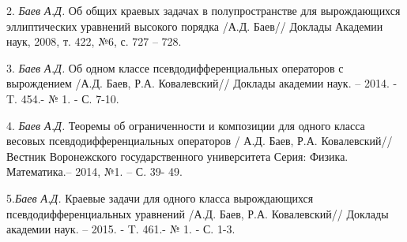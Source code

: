 2. {\it Баев А.Д.} Об общих краевых задачах в полупространстве для вырождающихся
эллиптических уравнений высокого порядка /А.Д. Баев// Доклады Академии наук,
2008, т. 422, №6, с. 727 -- 728.

3. {\it Баев А.Д.} Об одном классе псевдодифференциальных операторов с вырождением
/А.Д. Баев, Р.А. Ковалевский// Доклады академии наук. -- 2014. - T. 454.- №
1. - С. 7-10.

4. {\it Баев А.Д.} Теоремы об ограниченности и композиции для одного класса весовых
псевдодифференциальных операторов / А.Д. Баев, Р.А. Ковалевский// Вестник
Воронежского государственного университета Серия: Физика. Математика.--
2014, №1. -- С. 39- 49.

5.{\it Баев А.Д.} Краевые задачи для одного класса вырождающихся
псевдодифференциальных уравнений /А.Д. Баев, Р.А. Ковалевский// Доклады
академии наук. -- 2015. - T. 461.- № 1. - С. 1-3.
